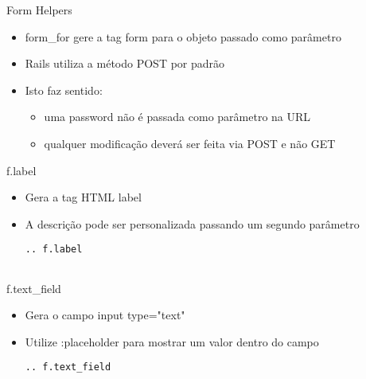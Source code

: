 \begin{frame}{Form Helpers}
	\begin{itemize}
		\item \alert{form_for} gere a tag form para o objeto passado como parâmetro
		\item Rails utiliza a método \alert{POST} por padrão
		\item Isto faz sentido:
		\begin{itemize}
			\item uma password não é passada como parâmetro na URL
			\item qualquer modificação deverá ser feita via POST e não GET
		\end{itemize}
	\end{itemize}	
\end{frame}
\begin{frame}{f.label}
	\begin{itemize}
		\item Gera a tag HTML label 
		\item A descrição pode ser personalizada passando um segundo parâmetro
		\begin{lstlisting}[style=RubyInputStyle, caption=posts_controller.rb]
			.. f.label
			
		\end{lstlisting}	
	\end{itemize}	
\end{frame}
\begin{frame}{f.text_field}
	\begin{itemize}
		\item Gera o campo input type="text" 
		\item Utilize \alert{:placeholder} para mostrar um valor dentro do campo
		\begin{lstlisting}[style=RubyInputStyle, caption=posts_controller.rb]
			.. f.text_field
			
		\end{lstlisting}	
	\end{itemize}	
\end{frame}
